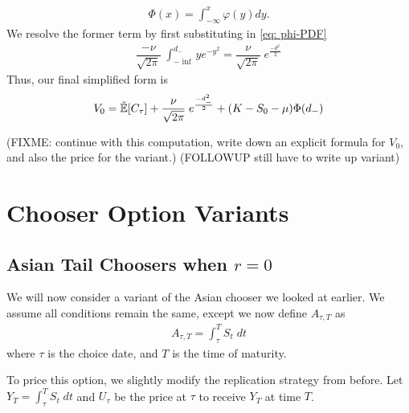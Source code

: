 \documentclass[reqno]{amsart}
\begin{document}
\begin{align} \label{eq: cdfnormal}
     \Phi(x) = \int_{-\infty}^x \varphi(y) dy.
\end{align}
We resolve the former term by first substituting in \eqref{eq: phi-PDF}
\begin{align}
     \dfrac{-\nu}{\sqrt{2\pi}} \;\int_{-\inf}^{d_{-}} ye^{-y^2} = \dfrac{\nu}{\sqrt{2\pi}} \;e^{\frac{-d_-^2}{2}}
\end{align}
Thus, our final simplified form is
\begin{align}
     V_0 = \tilde{\mathbb{E}}[C_\tau] + \dfrac{\nu}{\sqrt{2\pi}} \;e^{\frac{-d_-^2}{2}} +  (K- S_0 - \mu) \Phi(d_-) 
\end{align}

(FIXME: continue with this computation, write down an explicit formula for $V_0$, and also the price for the variant.) (FOLLOWUP still have to write up variant)

\section{Chooser Option Variants}

\subsection{Asian Tail Choosers when $r = 0$}
We will now consider a variant of the Asian chooser we looked at earlier. We assume all conditions remain the same, except we now define $A_{\tau, T}$ as
\begin{align}
     A_{\tau, T} = \int_\tau^T S_t \;dt
\end{align}
where $\tau$ is the choice date, and $T$ is the time of maturity.

To price this option, we slightly modify the replication strategy from before. Let $Y_T = \int_\tau^T S_t \;dt$ and $U_\tau$ be the price at $\tau$ to receive $Y_T$ at time $T$.
\end{document}
